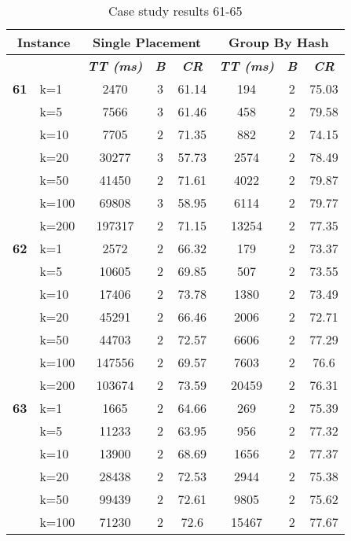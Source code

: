     \begin{table}[htbp]
    \caption{Case study results 61-65}
    \centering
    \begin{tabular}{|l|l|c|c|c|c|c|c|}
    \hline
    \multicolumn{ 2}{|c|}{\textbf{Instance}} & \multicolumn{ 3}{c|}{\textbf{Single Placement}} & \multicolumn{ 3}{c|}{\textbf{Group By Hash}} \\ \hline
    \multicolumn{ 2}{|l|}{} & \textbf{\textit{TT (ms)}} & \textbf{\textit{B}} & \textbf{\textit{CR}} & \textbf{\textit{TT (ms)}} & \textbf{\textit{B}} & \textbf{\textit{CR}} \\ \hline
    \multicolumn{1}{|r|}{\textbf{61}} & k=1 & 2470 & 3 & 61.14 & 194 & 2 & 75.03 \\ 
     & k=5 & 7566 & 3 & 61.46 & 458 & 2 & 79.58 \\ 
     & k=10 & 7705 & 2 & 71.35 & 882 & 2 & 74.15 \\ 
     & k=20 & 30277 & 3 & 57.73 & 2574 & 2 & 78.49 \\ 
     & k=50 & 41450 & 2 & 71.61 & 4022 & 2 & 79.87 \\ 
     & k=100 & 69808 & 3 & 58.95 & 6114 & 2 & 79.77 \\ 
     & k=200 & 197317 & 2 & 71.15 & 13254 & 2 & 77.35 \\ \hline
    \multicolumn{1}{|r|}{\textbf{62}} & k=1 & 2572 & 2 & 66.32 & 179 & 2 & 73.37 \\ 
     & k=5 & 10605 & 2 & 69.85 & 507 & 2 & 73.55 \\ 
     & k=10 & 17406 & 2 & 73.78 & 1380 & 2 & 73.49 \\ 
     & k=20 & 45291 & 2 & 66.46 & 2006 & 2 & 72.71 \\ 
     & k=50 & 44703 & 2 & 72.57 & 6606 & 2 & 77.29 \\ 
     & k=100 & 147556 & 2 & 69.57 & 7603 & 2 & 76.6 \\ 
     & k=200 & 103674 & 2 & 73.59 & 20459 & 2 & 76.31 \\ \hline
    \multicolumn{1}{|r|}{\textbf{63}} & k=1 & 1665 & 2 & 64.66 & 269 & 2 & 75.39 \\ 
     & k=5 & 11233 & 2 & 63.95 & 956 & 2 & 77.32 \\ 
     & k=10 & 13900 & 2 & 68.69 & 1656 & 2 & 77.37 \\ 
     & k=20 & 28438 & 2 & 72.53 & 2944 & 2 & 75.38 \\ 
     & k=50 & 99439 & 2 & 72.61 & 9805 & 2 & 75.62 \\ 
     & k=100 & 71230 & 2 & 72.6 & 15467 & 2 & 77.67 \\ 

\end{tabular}
\end{table}
